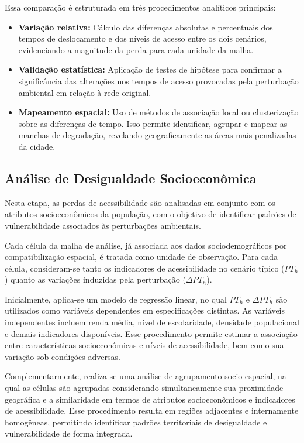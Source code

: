 Essa comparação é estruturada em três procedimentos analíticos principais:

\begin{itemize}
    \item \textbf{Variação relativa:} Cálculo das diferenças absolutas e percentuais dos tempos de deslocamento e dos níveis de acesso entre os dois cenários, evidenciando a magnitude da perda para cada unidade da malha.
    \item \textbf{Validação estatística:} Aplicação de testes de hipótese para confirmar a significância das alterações nos tempos de acesso provocadas pela perturbação ambiental em relação à rede original.
    \item \textbf{Mapeamento espacial:} Uso de métodos de associação local ou clusterização sobre as diferenças de tempo. Isso permite identificar, agrupar e mapear as manchas de degradação, revelando geograficamente as áreas mais penalizadas da cidade.
\end{itemize}

\subsection{Análise de Desigualdade Socioeconômica}
\label{subsec:socioeconomical}

Nesta etapa, as perdas de acessibilidade são analisadas em conjunto com os atributos socioeconômicos da população, com o objetivo de identificar padrões de vulnerabilidade associados às perturbações ambientais.

Cada célula da malha de análise, já associada aos dados sociodemográficos por compatibilização espacial, é tratada como unidade de observação. Para cada célula, consideram-se tanto os indicadores de acessibilidade no cenário típico ($PT_h$) quanto as variações induzidas pela perturbação ($\Delta PT_h$).

Inicialmente, aplica-se um modelo de regressão linear, no qual $PT_h$ e $\Delta PT_h$ são utilizados como variáveis dependentes em especificações distintas. As variáveis independentes incluem renda média, nível de escolaridade, densidade populacional e demais indicadores disponíveis. Esse procedimento permite estimar a associação entre características socioeconômicas e níveis de acessibilidade, bem como sua variação sob condições adversas.

Complementarmente, realiza-se uma análise de agrupamento socio-espacial, na qual as células são agrupadas considerando simultaneamente sua proximidade geográfica e a similaridade em termos de atributos socioeconômicos e indicadores de acessibilidade. Esse procedimento resulta em regiões adjacentes e internamente homogêneas, permitindo identificar padrões territoriais de desigualdade e vulnerabilidade de forma integrada.

